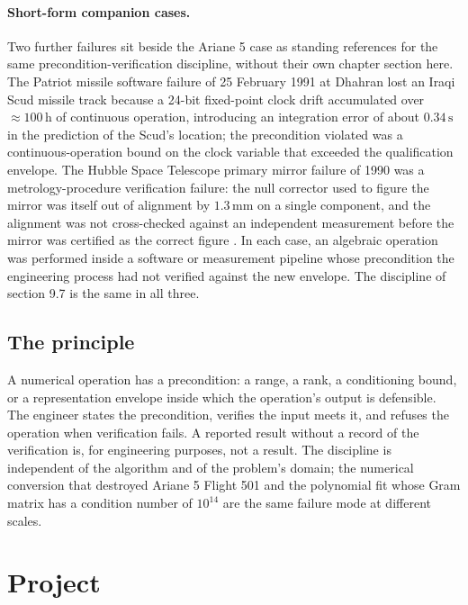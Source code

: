 \paragraph{Short-form companion cases.}
Two further failures sit beside the Ariane 5 case as standing
references for the same precondition-verification discipline,
without their own chapter section here. The Patriot missile
software failure of 25 February 1991 at Dhahran lost an Iraqi Scud
missile track because a 24-bit fixed-point clock drift accumulated
over $\approx 100\,\si{\hour}$ of continuous operation,
introducing an integration error of about $0.34\,\si{\second}$ in
the prediction of the Scud's location; the precondition violated
was a continuous-operation bound on the clock variable that
exceeded the qualification envelope. The Hubble Space Telescope
primary mirror failure of 1990 was a metrology-procedure
verification failure: the null corrector used to figure the mirror
was itself out of alignment by $1.3\,\si{\milli\meter}$ on a single
component, and the alignment was not cross-checked against an
independent measurement before the mirror was certified as the
correct figure \cite{acc:nasa-hubble-optical-systems-1990}. In
each case, an algebraic operation was performed inside a software
or measurement pipeline whose precondition the engineering process
had not verified against the new envelope. The discipline of
section 9.7 is the same in all three.

\subsection{The principle}

\begin{principle}
A numerical operation has a precondition: a range, a rank, a
conditioning bound, or a representation envelope inside which the
operation's output is defensible. The engineer states the
precondition, verifies the input meets it, and refuses the
operation when verification fails. A reported result without a
record of the verification is, for engineering purposes, not a
result. The discipline is independent of the algorithm and of the
problem's domain; the numerical conversion that destroyed Ariane 5
Flight 501 and the polynomial fit whose Gram matrix has a condition
number of $10^{14}$ are the same failure mode at different scales.
\end{principle}

\section{Project}

